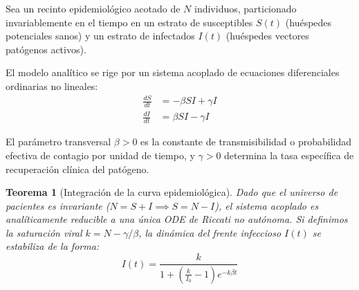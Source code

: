 \documentclass[11pt,a4paper]{article}
\theoremstyle{definition}
\theoremstyle{plain}
\newtheorem{theorem}{Teorema}[section]
\begin{document}
Sea un recinto epidemiológico acotado de $N$ individuos, particionado invariablemente en el tiempo en un estrato de susceptibles $S(t)$ (huéspedes potenciales sanos) y un estrato de infectados $I(t)$ (huéspedes vectores patógenos activos).

El modelo analítico se rige por un sistema acoplado de ecuaciones diferenciales ordinarias no lineales:
\begin{align}
    \frac{dS}{dt} &= -\beta S I + \gamma I \\
    \frac{dI}{dt} &= \beta S I - \gamma I
\end{align}

El parámetro transversal $\beta > 0$ es la constante de transmisibilidad o probabilidad efectiva de contagio por unidad de tiempo, y $\gamma > 0$ determina la tasa específica de recuperación clínica del patógeno.

\begin{theorem}[Integración de la curva epidemiológica]
Dado que el universo de pacientes es invariante ($N = S + I \implies S = N - I$), el sistema acoplado es analíticamente reducible a una única ODE de Riccati no autónoma. Si definimos la saturación viral $k = N - \gamma/\beta$, la dinámica del frente infeccioso $I(t)$ se estabiliza de la forma:
\begin{equation}
    I(t) = \frac{k}{1 + \left(\frac{k}{I_0} - 1\right) e^{-k\beta t}}
\end{equation}
\end{theorem}
\end{document}
